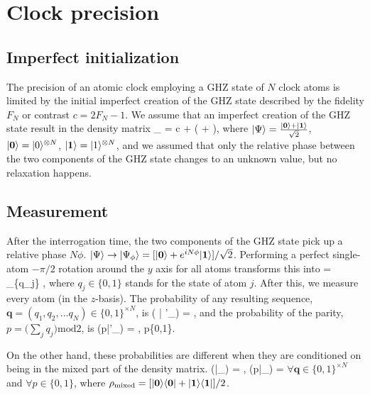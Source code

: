 \section{Clock precision}

\subsection{Imperfect initialization}
The precision of an atomic clock employing a GHZ state of $N$ clock atoms is
limited by the initial imperfect creation of the GHZ state
described by the fidelity $F_N$ or contrast $c = 2F_N -1$.
We assume that an imperfect creation of the GHZ state result in the density
matrix 
\bel
	\rho_ = c \ket{\Psi}
	\bra{\Psi}
	 + \big(
	 +  \big),
\eel
where $| \Psi \rangle = \frac{| \mathbf{0} \rangle + | \mathbf{1} \rangle
}{\sqrt{2}}$, $| \mathbf{0} \rangle = | 0 \rangle^{\otimes N}$, $| \mathbf{1} \rangle =
| 1 \rangle^{\otimes N}$, and we assumed that only the relative phase between the
two components of the GHZ state changes to an unknown value,  but no
relaxation happens.

\subsection{Measurement}
After the interrogation time, the two components of the GHZ state pick up a
relative phase $N\phi$. $| \Psi \rangle\rightarrow | \Psi_\phi \rangle =
[| \mathbf{0} \rangle + e^{iN\phi}| \mathbf{1} \rangle]/\sqrt{2}$. Performing a perfect
single-atom $-\pi/2$ rotation around the $y$ axis for all atoms transforms this
into
\bel
	 = \sum_{\{q_j\}}  ,
\eel
where $q_j\in\{0,1\}$ stands for the state of atom $j$. After this, we 
measure every atom (in the $z$-basis). The probability of any resulting
sequence, $\mathbf{q} = (q_1, q_2, \dots q_N) \in \{0,1\}^{\times N}$, is
\bel
	\PP( | \Psi'_\phi) =  ,
\eel
and the probability of the parity, $p = \big(\sum_j q_j\big)\mathrm{ mod } 2$, is
\bel
	\PP(p|\Psi'_\phi) = , \qquad p\in\{0,1\}.
\eel

On the other hand, these probabilities are different when they are conditioned
on being in the mixed part of the density matrix.
\bel
	\PP(|\rho_) = , \qquad
	\PP(p|\rho_) = 
\eel
$\forall \mathbf{q}\in\{0,1\}^{\times N}$ and $\forall p\in\{0,1\}$, where
$\rho_\mathrm{mixed} = [| \mathbf{0} \rangle\langle \mathbf{0} | +
| \mathbf{1} \rangle\langle \mathbf{1} |]/2$.

